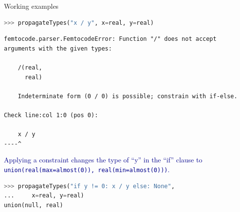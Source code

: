 \documentclass{beamer}
\begin{document}
\begin{frame}[fragile]{Working examples}
\vspace{0.2 cm}
\begin{lstlisting}[language=python]
>>> propagateTypes("x / y", x=real, y=real)
\end{lstlisting}
\color{red}
\begin{lstlisting}[basicstyle=\ttfamily\scriptsize]
femtocode.parser.FemtocodeError: Function "/" does not accept arguments with the given types:

    /(real,
      real)

    Indeterminate form (0 / 0) is possible; constrain with if-else.

Check line:col 1:0 (pos 0):

    x / y
----^
\end{lstlisting}

\textcolor{darkblue}{Applying a constraint changes the type of ``y'' in the ``if'' clause to {\tt\small union(real(max=almost(0)), real(min=almost(0)))}.}
\color{black}
\begin{lstlisting}[language=python]
>>> propagateTypes("if y != 0: x / y else: None",
...     x=real, y=real)
union(null, real)
\end{lstlisting}
\end{frame}
\end{document}
